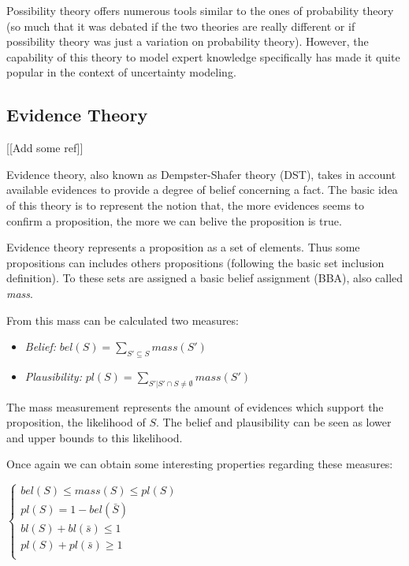 Possibility theory offers numerous tools similar to the ones of probability theory (so much that it was debated if the two theories are really different or if possibility theory was just a variation on probability theory). However, the capability of this theory to model expert knowledge specifically has made it quite popular in the context of uncertainty modeling.

\subsection{Evidence Theory}

[[Add some ref]]

Evidence theory, also known as Dempster-Shafer theory (DST), takes in account available evidences to provide a degree of belief concerning a fact.
The basic idea of this theory is to represent the notion that, the more evidences seems to confirm a proposition, the more we can belive the proposition is true.

Evidence theory represents a proposition as a set of elements. Thus some propositions can includes others propositions (following the basic set inclusion definition). To these sets are assigned a basic belief assignment (BBA), also called \emph{mass}.

From this mass can be calculated two measures:

\begin{itemize}
\item \emph{Belief:} $bel(S) = \sum_{S'\subseteq{S}} mass(S')$
\item \emph{Plausibility:} $pl(S) = \sum_{S'|S' \cap S \neq \emptyset} mass(S')$
\end{itemize}

The mass measurement represents the amount of evidences which support the proposition, the likelihood of $S$. The belief and plausibility can be seen as lower and upper bounds to this likelihood.

Once again we can obtain some interesting properties regarding these measures:

$\left\{
\begin{array}{l}
bel(S) \leq mass(S) \leq pl(S)\\
pl(S) = 1 - bel(\bar{S})\\
bl(S) + bl(\bar{s}) \leq 1\\
pl(S) + pl(\bar{s}) \geq 1\\
\end{array}
\right.$

